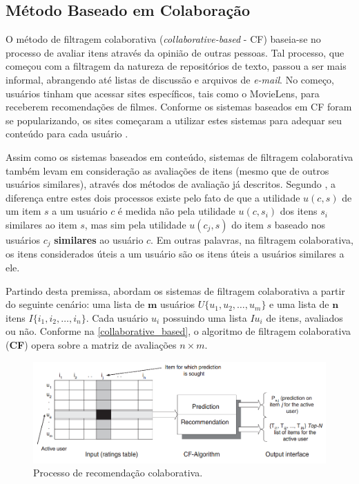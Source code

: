 \documentclass[12pt, openright, oneside, a4paper, brazil]{abntex2}
\begin{document}
\subsection{Método Baseado em Colaboração} \label{recs:collaborative_based}

O método de filtragem colaborativa (\textit{collaborative-based} - CF) baseia-se no processo de avaliar itens através da opinião de outras pessoas. Tal processo, que começou com a filtragem da natureza de repositórios de texto, passou a ser mais informal, abrangendo até listas de discussão e arquivos de \textit{e-mail}. No começo, usuários tinham que acessar sites específicos, tais como o MovieLens, para receberem recomendações de filmes. Conforme os sistemas baseados em CF foram se popularizando, os sites começaram a utilizar estes sistemas para adequar seu conteúdo para cada usuário \cite{schafer2007collaborative}.

Assim como os sistemas baseados em conteúdo, sistemas de filtragem colaborativa também levam em consideração as avaliações de itens (mesmo que de outros usuários similares), através dos métodos de avaliação já descritos. Segundo , a diferença entre estes dois processos existe pelo fato de que a utilidade $u(c,s)$ de um item $s$ a um usuário $c$ é medida não pela utilidade $u(c,s_{i})$ dos itens $s_{i}$ similares ao item $s$, mas sim pela utilidade $u(c_{j}, s)$ do item $s$ baseado nos usuários $c_{j}$ \textbf{similares} ao usuário $c$. Em outras palavras, na filtragem colaborativa, os itens considerados úteis a um usuário são os itens úteis a usuários similares a ele.

Partindo desta premissa,  abordam os sistemas de filtragem colaborativa a partir do seguinte cenário: uma lista de $\textbf{m}$ usuários $U \lbrace u_{1}, u_{2}, …, u_{m} \rbrace$ e uma lista de $\textbf{n}$ itens $I \lbrace i_{1}, i_{2}, …, i_{n} \rbrace$. Cada usuário $u_{i}$ possuindo uma lista $Iu_{i}$ de itens, avaliados ou não. Conforme na \autoref{collaborative_based}, o algoritmo de filtragem colaborativa (\textbf{CF}) opera sobre a matriz de avaliações $n \times m$.

\begin{figure}[htb]
	\caption{\label{collaborative_based}Processo de recomendação colaborativa.}
	\begin{center}
		\includegraphics[scale=0.6]{images/collaborative_based.png}
	\end{center}
\end{figure}
\end{document}
